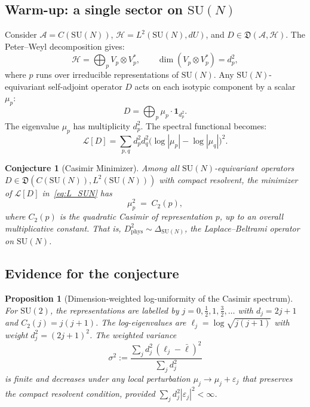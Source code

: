 \documentclass[12pt]{article}
\newtheorem{proposition}[theorem]{Proposition}
\newtheorem{conjecture}[theorem]{Conjecture}
\theoremstyle{definition}
\theoremstyle{remark}
\newcommand{\SU}{\mathrm{SU}}
\begin{document}
\subsection{Warm-up: a single sector on $\SU(N)$}

Consider $\mathcal{A} = C(\SU(N))$, $\mathcal{H} = L^2(\SU(N), dU)$,
and $D \in \mathfrak{D}(\mathcal{A},\mathcal{H})$.  The Peter--Weyl
decomposition gives:
\begin{equation}\label{eq:PW}
  \mathcal{H}
  = \bigoplus_{p} V_p \otimes V_p^*,
  \qquad \dim(V_p \otimes V_p^*) = d_p^2,
\end{equation}
where $p$ runs over irreducible representations of $\SU(N)$.
Any $\SU(N)$-equivariant self-adjoint operator $D$ acts on each
isotypic component by a scalar $\mu_p$:
\begin{equation}\label{eq:D_PW}
  D = \bigoplus_p \mu_p \cdot \mathbf{1}_{d_p^2}.
\end{equation}
The eigenvalue $\mu_p$ has multiplicity $d_p^2$.  The spectral
functional becomes:
\begin{equation}\label{eq:L_SUN}
  \mathcal{L}[D]
  = \sum_{p,q} d_p^2 d_q^2
    \bigl(\log|\mu_p| - \log|\mu_q|\bigr)^2.
\end{equation}

\begin{conjecture}[Casimir Minimizer]\label{conj:casimir}
Among all $\SU(N)$-equivariant operators
$D \in \mathfrak{D}(C(\SU(N)), L^2(\SU(N)))$ with compact resolvent,
the minimizer of $\mathcal{L}[D]$ in~\eqref{eq:L_SUN} has
\begin{equation}\label{eq:casimir_min}
  \mu_p^2 \;=\; C_2(p),
\end{equation}
where $C_2(p)$ is the quadratic Casimir of representation $p$, up to
an overall multiplicative constant.  That is,
$D_{\mathrm{phys}}^2 \sim \Delta_{\SU(N)}$, the Laplace--Beltrami
operator on $\SU(N)$.
\end{conjecture}

\subsection{Evidence for the conjecture}

\begin{proposition}[Dimension-weighted log-uniformity of the Casimir spectrum]
\label{prop:casimir_uniform}
For $\SU(2)$, the representations are labelled by $j = 0, \tfrac{1}{2},
1, \tfrac{3}{2}, \ldots$ with $d_j = 2j+1$ and $C_2(j) = j(j+1)$.
The log-eigenvalues are $\ell_j = \log\sqrt{j(j+1)}$ with weight
$d_j^2 = (2j+1)^2$.  The weighted variance
\begin{equation}\label{eq:weighted_var}
  \sigma^2 := \frac{\sum_j d_j^2\,(\ell_j - \bar\ell)^2}
                    {\sum_j d_j^2}
\end{equation}
is finite and decreases under any local perturbation
$\mu_j \to \mu_j + \varepsilon_j$ that preserves the compact
resolvent condition, provided $\sum_j d_j^2 |\varepsilon_j|^2 < \infty$.
\end{proposition}
\end{document}
